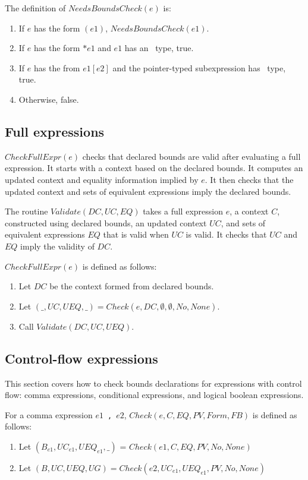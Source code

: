 The definition of $NeedsBoundsCheck(e)$ is:
\begin{enumerate}
\item If $e$ has the form $(e1)$, $NeedsBoundsCheck(e1).$
\item If $e$ has the form $*e1$ and $e1$ has an \arrayptr\ type, true.
\item If $e$ has the from $e1[e2]$ and the pointer-typed subexpression has \arrayptr\ type, true.
\item Otherwise, false.
\end{enumerate}


\subsection{Full expressions}

$CheckFullExpr(e)$ checks that declared bounds are valid after 
evaluating a full expression.  It starts with a context based on the
declared bounds. It computes an updated context and equality information
implied by $e$.  It then checks that the updated context 
and sets of equivalent expressions imply the declared bounds.

The routine $Validate(DC, UC, EQ)$ takes a full expression $e$, a context $C$,
constructed using declared bounds, an updated context $UC$, and sets of equivalent expressions $EQ$
that is valid when $UC$ is valid.  It checks that $UC$ and $EQ$ imply the validity of $DC$.

$CheckFullExpr(e)$ is defined as follows:
\begin{enumerate}
\item Let $DC$ be the context formed from declared bounds.
\item Let $(\_, UC, UEQ, \_) = Check(e, DC, \emptyset, \emptyset, No, None)$.
\item Call $Validate(DC, UC, UEQ)$.
\end{enumerate}

\subsection{Control-flow expressions}

This section covers how to check bounds declarations for expressions
with control flow: comma expressions, conditional expressions, and
logical boolean expressions.

For a comma expression $e1$~\lstinline|,|~$e2$, $Check(e, C, EQ, PV, Form, FB)$ is defined as follows:
\begin{enumerate}
\item Let $(B_{e1}, {UC}_{e1}, {UEQ}_{e1}, \_)$ = $Check(e1, C, EQ, PV, No, None)$
\item Let $(B, UC, UEQ, UG) = Check(e2, {UC}_{e1}, {UEQ}_{e1}, PV, No, None)$
\end{enumerate}

